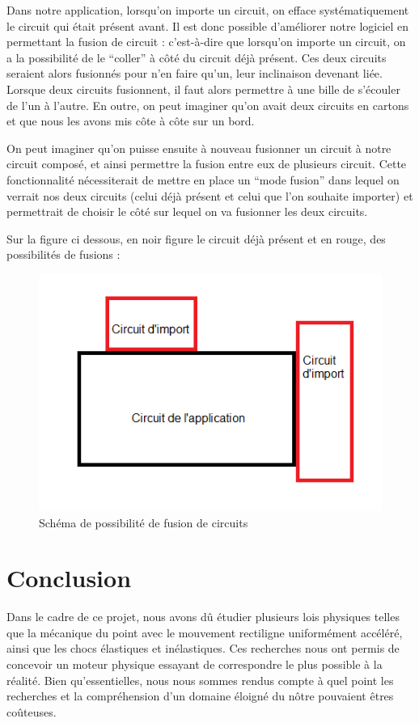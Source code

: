 \documentclass{report}
\begin{document}
Dans notre application, lorsqu’on importe un circuit, on efface systématiquement le circuit qui était présent avant. Il est donc possible d’améliorer notre logiciel en permettant la fusion de circuit : c’est-à-dire que lorsqu’on importe un circuit, on a la possibilité de le “coller” à côté du circuit déjà présent. Ces deux circuits seraient alors fusionnés pour n’en faire qu’un, leur inclinaison devenant liée. Lorsque deux circuits fusionnent, il faut alors permettre à une bille de s’écouler de l’un à l’autre. En outre, on peut imaginer qu’on avait deux circuits en cartons et que nous les avons mis côte à côte sur un bord.

On peut imaginer qu’on puisse ensuite à nouveau fusionner un circuit à notre circuit composé, et ainsi permettre la fusion entre eux de plusieurs circuit.
Cette fonctionnalité nécessiterait de mettre en place un “mode fusion” dans lequel on verrait nos deux circuits (celui déjà présent et celui que l’on souhaite importer) et permettrait de choisir le côté sur lequel on va fusionner les deux circuits. 

Sur la figure ci dessous, en noir figure le circuit déjà présent et en rouge, des possibilités de fusions  :

\begin{figure}[H]
\centering
\includegraphics[scale=1.0]{fusioncircuits.png}
\caption{Schéma de possibilité de fusion de circuits}
\end{figure}

\chapter{Conclusion}

Dans le cadre de ce projet, nous avons dû étudier plusieurs lois physiques telles que la mécanique du point avec le mouvement rectiligne uniformément accéléré, ainsi que les chocs élastiques et inélastiques. Ces recherches nous ont permis de concevoir un moteur physique essayant de correspondre le plus possible à la réalité. Bien qu’essentielles, nous nous sommes rendus compte à quel point les recherches et la compréhension d’un domaine éloigné du nôtre pouvaient êtres coûteuses. \\
\end{document}
